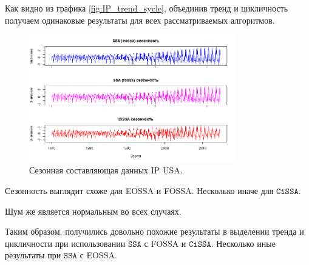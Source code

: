 \documentclass[12pt, specialist, subf
]{disser}
\theoremstyle{definition}
\newcommand{\SSA}{\texttt{SSA}}
\newcommand{\CISSA}{\texttt{CiSSA}}
\begin{document}
Как видно из графика \ref{fig:IP_trend_sycle}, объединив тренд и цикличность получаем одинаковые результаты для всех рассматриваемых алгоритмов.

\begin{figure}[H]
	\centering
	\includegraphics[width=0.8\textwidth]{img/trend inseparability example/IP_sesonal.jpg}
	\caption{Сезонная составляющая данных IP USA.}
	\label{fig:IP_sesonal}
\end{figure}

Сезонность выглядит схоже для EOSSA и FOSSA. Несколько иначе для $\CISSA$.

Шум же является нормальным во всех случаях.




Таким образом, получились довольно похожие результаты в выделении тренда и цикличности при использовании $\SSA$ с FOSSA и $\CISSA$. Несколько иные результаты при $\SSA$ с EOSSA.
\end{document}
